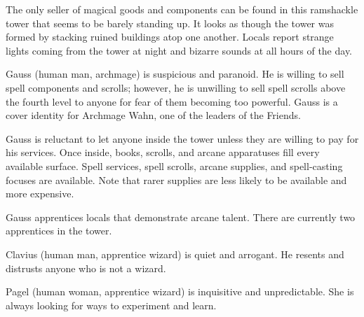The only seller of magical goods and components can be found in this ramshackle tower that seems to be barely standing up.
It looks as though the tower was formed by stacking ruined buildings atop one another.
Locals report strange lights coming from the tower at night and bizarre sounds at all hours of the day.

Gauss (human man, archmage) is suspicious and paranoid.
He is willing to sell spell components and scrolls; however, he is unwilling to sell spell scrolls above the fourth level to anyone for fear of them becoming too powerful.
Gauss is a cover identity for Archmage Wahn, one of the leaders of the Friends.

Gauss is reluctant to let anyone inside the tower unless they are willing to pay for his services.
Once inside, books, scrolls, and arcane apparatuses fill every available surface.
Spell services, spell scrolls, arcane supplies, and spell-casting focuses are available.
Note that rarer supplies are less likely to be available and more expensive.

Gauss apprentices locals that demonstrate arcane talent.
There are currently two apprentices in the tower.

Clavius (human man, apprentice wizard) is quiet and arrogant.
He resents and distrusts anyone who is not a wizard.

Pagel (human woman, apprentice wizard) is inquisitive and unpredictable.
She is always looking for ways to experiment and learn.
